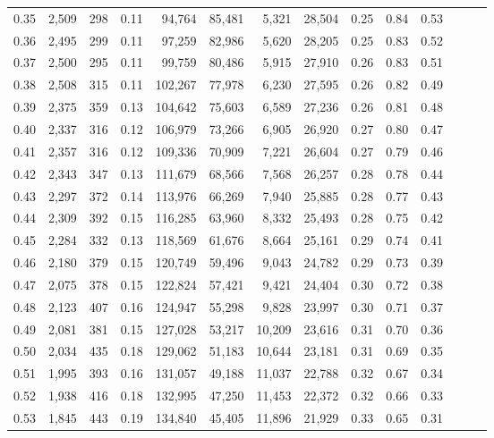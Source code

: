 \begin{tabular}{rrrrrrrrrrrrrr}
0.35 &  2,509 &  298 &  0.11 &   94,764 &   85,481 &   5,321 &  28,504 &  0.25 &  0.84 &      0.53 \\
0.36 &  2,495 &  299 &  0.11 &   97,259 &   82,986 &   5,620 &  28,205 &  0.25 &  0.83 &      0.52 \\
0.37 &  2,500 &  295 &  0.11 &   99,759 &   80,486 &   5,915 &  27,910 &  0.26 &  0.83 &      0.51 \\
0.38 &  2,508 &  315 &  0.11 &  102,267 &   77,978 &   6,230 &  27,595 &  0.26 &  0.82 &      0.49 \\
0.39 &  2,375 &  359 &  0.13 &  104,642 &   75,603 &   6,589 &  27,236 &  0.26 &  0.81 &      0.48 \\
0.40 &  2,337 &  316 &  0.12 &  106,979 &   73,266 &   6,905 &  26,920 &  0.27 &  0.80 &      0.47 \\
0.41 &  2,357 &  316 &  0.12 &  109,336 &   70,909 &   7,221 &  26,604 &  0.27 &  0.79 &      0.46 \\
0.42 &  2,343 &  347 &  0.13 &  111,679 &   68,566 &   7,568 &  26,257 &  0.28 &  0.78 &      0.44 \\
0.43 &  2,297 &  372 &  0.14 &  113,976 &   66,269 &   7,940 &  25,885 &  0.28 &  0.77 &      0.43 \\
0.44 &  2,309 &  392 &  0.15 &  116,285 &   63,960 &   8,332 &  25,493 &  0.28 &  0.75 &      0.42 \\
0.45 &  2,284 &  332 &  0.13 &  118,569 &   61,676 &   8,664 &  25,161 &  0.29 &  0.74 &      0.41 \\
0.46 &  2,180 &  379 &  0.15 &  120,749 &   59,496 &   9,043 &  24,782 &  0.29 &  0.73 &      0.39 \\
0.47 &  2,075 &  378 &  0.15 &  122,824 &   57,421 &   9,421 &  24,404 &  0.30 &  0.72 &      0.38 \\
0.48 &  2,123 &  407 &  0.16 &  124,947 &   55,298 &   9,828 &  23,997 &  0.30 &  0.71 &      0.37 \\
0.49 &  2,081 &  381 &  0.15 &  127,028 &   53,217 &  10,209 &  23,616 &  0.31 &  0.70 &      0.36 \\
0.50 &  2,034 &  435 &  0.18 &  129,062 &   51,183 &  10,644 &  23,181 &  0.31 &  0.69 &      0.35 \\
0.51 &  1,995 &  393 &  0.16 &  131,057 &   49,188 &  11,037 &  22,788 &  0.32 &  0.67 &      0.34 \\
0.52 &  1,938 &  416 &  0.18 &  132,995 &   47,250 &  11,453 &  22,372 &  0.32 &  0.66 &      0.33 \\
0.53 &  1,845 &  443 &  0.19 &  134,840 &   45,405 &  11,896 &  21,929 &  0.33 &  0.65 &      0.31 \\

\end{tabular}
